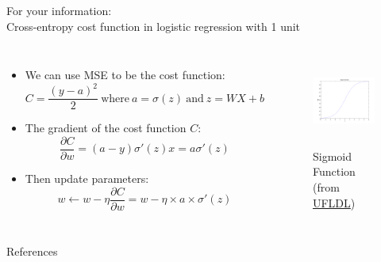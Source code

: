 \documentclass[10pt]{beamer}
\begin{document}
	\begin{frame}{For your information: \\ Cross-entropy cost function in logistic regression with 1 unit}
		\begin{columns}
			\begin{itemize}
				\item We can use MSE to be the cost function:
				$$C=\frac{(y-a)^2}{2} ~\text{where}~ a=\sigma(z) ~\text{and}~ z=WX+b$$
				\item The gradient of the cost function $C$:
				$$\frac{\partial C}{\partial w}=(a-y)\sigma'(z)x=a\sigma'(z)$$
				\item Then update parameters:
				$$w\leftarrow w-\eta\frac{\partial C}{\partial w}=w-\eta\times a\times \sigma'(z)$$
			\end{itemize}
			\begin{figure}
				\includegraphics[height=8em]{figures/sigmoid.png}
				\caption{Sigmoid Function (from \href{http://ufldl.stanford.edu/wiki/index.php/File:Sigmoid_Function.png}{UFLDL})}
			\end{figure}
		\end{columns}
	\end{frame}
	


	\begin{frame}[allowframebreaks]{References}
		
		
	\end{frame}
\end{document}
